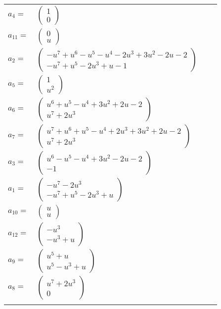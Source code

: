 \documentclass[1p]{elsarticle_modified}
\theoremstyle{definition}
\begin{document}
\begin{tabular}{m{7pt} m{180pt} m{7pt} m{180pt} }
\flushright $a_{4}=$&$\begin{pmatrix}1\\0\end{pmatrix}$ \\
\flushright $a_{11}=$&$\begin{pmatrix}0\\u\end{pmatrix}$ \\
\flushright $a_{2}=$&$\begin{pmatrix}- u^7+u^6- u^5- u^4-2 u^3+3 u^2-2 u-2\\- u^7+u^5-2 u^3+u-1\end{pmatrix}$ \\
\flushright $a_{5}=$&$\begin{pmatrix}1\\u^2\end{pmatrix}$ \\
\flushright $a_{6}=$&$\begin{pmatrix}u^6+u^5- u^4+3 u^2+2 u-2\\u^7+2 u^3\end{pmatrix}$ \\
\flushright $a_{7}=$&$\begin{pmatrix}u^7+u^6+u^5- u^4+2 u^3+3 u^2+2 u-2\\u^7+2 u^3\end{pmatrix}$ \\
\flushright $a_{3}=$&$\begin{pmatrix}u^6- u^5- u^4+3 u^2-2 u-2\\-1\end{pmatrix}$ \\
\flushright $a_{1}=$&$\begin{pmatrix}- u^7-2 u^3\\- u^7+u^5-2 u^3+u\end{pmatrix}$ \\
\flushright $a_{10}=$&$\begin{pmatrix}u\\u\end{pmatrix}$ \\
\flushright $a_{12}=$&$\begin{pmatrix}- u^3\\- u^3+u\end{pmatrix}$ \\
\flushright $a_{9}=$&$\begin{pmatrix}u^5+u\\u^5- u^3+u\end{pmatrix}$ \\
\flushright $a_{8}=$&$\begin{pmatrix}u^7+2 u^3\\0\end{pmatrix}$\\&\end{tabular}
\end{document}
